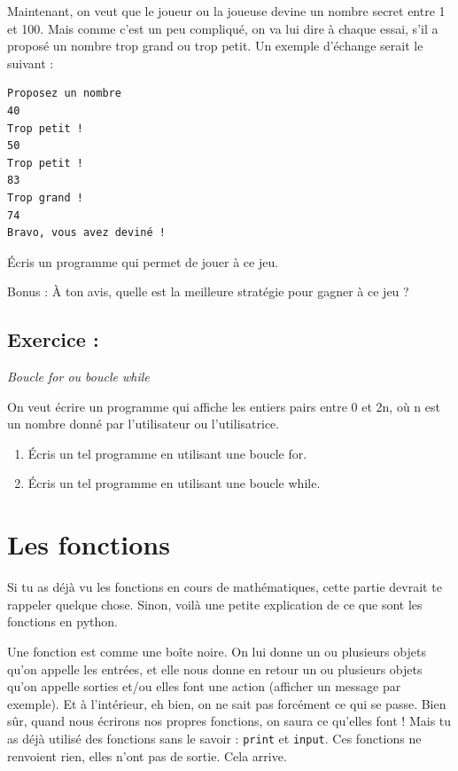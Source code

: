 \documentclass[a4paper,french,11pt]{article}
\begin{document}
Maintenant, on veut que le joueur ou la joueuse devine un nombre secret
entre 1 et 100. Mais comme c'est un peu compliqué, on va lui dire à
chaque essai, s'il a proposé un nombre trop grand ou trop petit. Un
exemple d'échange serait le suivant :

\begin{verbatim}
Proposez un nombre
40
Trop petit !
50
Trop petit !
83
Trop grand !
74
Bravo, vous avez deviné !
\end{verbatim}

Écris un programme qui permet de jouer à ce jeu.

Bonus : À ton avis, quelle est la meilleure stratégie pour gagner à ce
jeu ?

\hypertarget{exercice-19}{%
\subsection{Exercice :}\label{exercice-19}}

\emph{Boucle for ou boucle while}

On veut écrire un programme qui affiche les entiers pairs entre 0 et 2n,
où n est un nombre donné par l'utilisateur ou l'utilisatrice.

\begin{enumerate}
\def\labelenumi{\arabic{enumi}.}
\item
  Écris un tel programme en utilisant une boucle for.
\item
  Écris un tel programme en utilisant une boucle while.
\end{enumerate}

\hypertarget{les-fonctions}{%
\section{Les fonctions}\label{les-fonctions}}

Si tu as déjà vu les fonctions en cours de mathématiques, cette partie
devrait te rappeler quelque chose. Sinon, voilà une petite explication
de ce que sont les fonctions en python.

Une fonction est comme une boîte noire. On lui donne un ou plusieurs
objets qu'on appelle les entrées, et elle nous donne en retour un ou
plusieurs objets qu'on appelle sorties et/ou elles font une action
(afficher un message par exemple). Et à l'intérieur, eh bien, on ne sait
pas forcément ce qui se passe. Bien sûr, quand nous écrirons nos propres
fonctions, on saura ce qu'elles font ! Mais tu as déjà utilisé des
fonctions sans le savoir : \texttt{print} et
\texttt{input}. Ces fonctions ne renvoient rien, elles n'ont
pas de sortie. Cela arrive.
\end{document}
